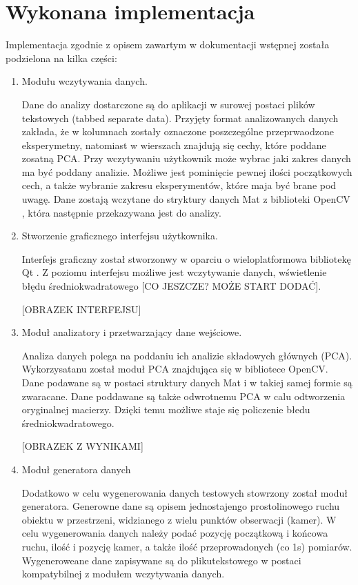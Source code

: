 \documentclass[a4paper,12pt]{article}
\begin{document}
\section{Wykonana implementacja}

Implementacja zgodnie z opisem zawartym w dokumentacji wstępnej została podzielona na kilka części:

\begin{enumerate}
\item Modułu wczytywania danych.

Dane do analizy dostarczone są do aplikacji w surowej postaci plików tekstowych (tabbed separate data). Przyjęty format analizowanych danych zakłada, że w kolumnach zostały oznaczone poszczególne przeprwaodzone eksperymetny, natomiast w wierszach znajdują się cechy, które poddane zosatną PCA.  Przy wczytywaniu użytkownik może wybrac jaki zakres danych ma być poddany analizie. Możliwe jest pominięcie pewnej ilości początkowych cech, a także wybranie zakresu eksperymentów, które maja być brane pod uwagę. Dane zostają wczytane do stryktury danych Mat z biblioteki OpenCV \cite{opencv}, która następnie przekazywana jest do analizy.
\item Stworzenie graficznego interfejsu użytkownika.

Interfejs graficzny został stworzonwy w oparciu o wieloplatformowa bibliotekę Qt \cite{qt}. Z poziomu interfejsu możliwe jest wczytywanie danych, wświetlenie błędu średniokwadratowego [CO JESZCZE? MOŻE START DODAĆ].

[OBRAZEK INTERFEJSU]

\item Moduł analizatory i przetwarzający dane wejściowe.

Analiza danych polega na poddaniu ich analizie składowych głównych (PCA). Wykorzysatanu został moduł PCA znajdująca się w bibliotece OpenCV. Dane podawane są w postaci struktury danych Mat i w takiej samej formie są zwaracane. Dane poddawane są także odwrotnemu PCA w calu odtworzenia oryginalnej macierzy. Dzięki temu możliwe staje się policzenie błedu średniokwadratowego. 

[OBRAZEK Z WYNIKAMI]

\item Moduł generatora danych

Dodatkowo w celu wygenerowania danych testowych stowrzony został moduł generatora. Generowne dane są opisem  jednostajengo prostolinowego ruchu obiektu w przestrzeni, widzianego z wielu punktów obserwacji (kamer). W celu wygenerowania danych należy podać pozycję początkową i końcowa ruchu, ilość i pozycję kamer, a także ilość przeprowadonych (co 1s) pomiarów. Wygeneroweane dane zapisywane są do plikutekstowego w postaci kompatybilnej z modułem wczytywania danych. 
\end{enumerate}
\end{document}
